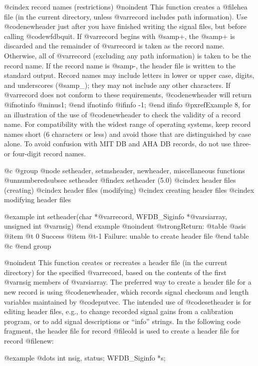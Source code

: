 {{{{{{{{@cindex record names (restrictions)
@noindent
This function creates a @file{hea} file (in the current directory, unless
@var{record} includes path information).
Use @code{newheader} just after you have finished writing the signal
files, but before calling @code{wfdbquit}.  If @var{record} begins with
@samp{+}, the @samp{+} is discarded and the remainder of @var{record} is
taken as the record name.  Otherwise, all of @var{record} (excluding any
path information) is taken to be
the record name.  If the record name is @samp{-}, the header file
is written to the standard output.  Record names may include letters in
lower or upper case, digits, and underscores (@samp{_}); they may not
include any other characters.  If @var{record} does not conform to these
requirements, @code{newheader} will return
@ifnotinfo
@minus{}1;
@end ifnotinfo
@ifinfo
-1;
@end ifinfo
@pxref{Example 8},
for an illustration of the use of @code{newheader} to check the validity
of a record name.  For compatibility with the widest range of operating
systems, keep record names short (6 characters or less) and avoid those
that are distinguished by case alone.  To avoid confusion with MIT DB
and AHA DB records, do not use three- or four-digit record names.

@c @group
@node     setheader, setmsheader, newheader, miscellaneous functions
@unnumberedsubsec setheader
@findex setheader (5.0)
@cindex header files (creating)
@cindex header files (modifying)
@cindex creating header files
@cindex modifying header files

@example
int setheader(char *@var{record}, WFDB_Siginfo *@var{siarray}, unsigned int @var{nsig})
@end example
@noindent
@strong{Return:}
@table @asis
@item @t{ 0}
Success
@item @t{-1}
Failure: unable to create header file
@end table
@c @end group

@noindent
This function creates or recreates a header file (in the current
directory) for the specified @var{record}, based on the contents of the
first @var{nsig} members of @var{siarray}.  The preferred way to create
a header file for a new record is using @code{newheader}, which records
signal checksum and length variables maintained by @code{putvec}.  The
intended use of @code{setheader} is for editing header files,
e.g., to change recorded signal gains from a calibration program, or to add
signal descriptions or ``info'' strings.  In the following code fragment, the
header file for record @file{old} is used to create a header file for
record @file{new}:

@example
@dots{}
int nsig, status;
WFDB_Siginfo *s;

}}}}}}}}
